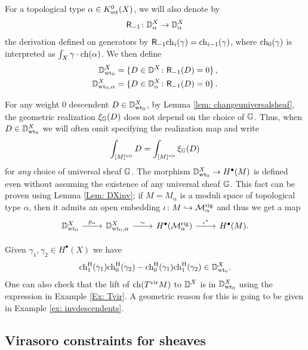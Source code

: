 \documentclass[a4paper, 12pt]{amsart}
\begin{document}
\begin{definition}\label{def: invariantdescendents}
For a topological type $\alpha\in K_{\text{sst}}^0(X)$, we will also denote by 
\[\mathsf{R}_{-1}\colon {\mathbb{D}}^X_{ \alpha}\to {\mathbb{D}}^X_{ \alpha}\] the derivation defined on generators by
$\mathsf{R}_{-1}\mathrm{ch}_i(\gamma)=\mathrm{ch}_{i-1}(\gamma)$,
where $\mathrm{ch}_0(\gamma)$ is interpreted as $\int_X \gamma\cdot \mathrm{ch}(\alpha)$.
We then define
\begin{align*}{\mathbb{D}}^X_{{\mathrm{wt}_0}}&=\{D\in {\mathbb{D}}^X\colon \mathsf{R}_{-1}(D)=0\}\,,\\
{\mathbb{D}}^X_{{\mathrm{wt}_0}, \alpha}&=\{D\in {\mathbb{D}}^X_{\alpha}\colon \mathsf{R}_{-1}(D)=0\}\,.
\end{align*} 
\end{definition}

For any weight 0 descendent $D\in {\mathbb{D}}^X_{{\mathrm{wt}_0}}$, by Lemma \ref{lem: changeuniversalsheaf}, the geometric realization $\xi_{{\mathbb{G}}}(D)$ does not depend on the choice of ${\mathbb{G}}$. Thus, when $D\in {\mathbb{D}}^X_{{\mathrm{wt}_0}}$ we will often omit specifying the realization map and write
\[\int_{[M]^{\mathrm{vir}}} D=\int_{[M]^{\mathrm{vir}}}\xi_{{\mathbb{G}}}(D)\]
for \emph{any} choice of universal sheaf ${\mathbb{G}}$. 
The morphism ${\mathbb{D}}^X_{{\mathrm{wt}_0}}\to H^\bullet(M)$ is defined even without assuming the existence of any universal sheaf ${\mathbb{G}}$. This fact can be proven using Lemma \ref{Lem: DXinv}; if $M=M_\alpha$ is a moduli space of topological type $\alpha$, then it admits an open embedding $\iota\colon M\hookrightarrow {\mathcal M}_\alpha^{\mathrm{rig}}$ and thus we get a map
\[\begin{tikzcd}
\BD^X_{\inv}\arrow[r, "p_\alpha"]&
\BD^X_{\inv, \alpha}\arrow[r, "\sim"]&
H^\bullet(\CM_\alpha^\rig)\arrow[r, "\iota^\ast"]&
H^\bullet(M).
\end{tikzcd}\]

\begin{example}\label{Ex: DXinvdescendents}
Given $\gamma_1,\gamma_2\in H^\bullet(X)$ we have
\[\mathrm{ch}^{\mathrm{H}}_1(\gamma_1)\mathrm{ch}^{\mathrm{H}}_0(\gamma_2)-\mathrm{ch}^{\mathrm{H}}_0(\gamma_1)\mathrm{ch}^{\mathrm{H}}_1(\gamma_2)\in {\mathbb{D}}^X_{{\mathrm{wt}_0}}.\]
One can also check that the lift of $\mathrm{ch}(T^{\mathrm{vir}} M)$ to ${\mathbb{D}}^X$ is in ${\mathbb{D}}^X_{{\mathrm{wt}_0}}$ using the expression in Example \ref{Ex: Tvir}. A geometric reason for this is going to be given in Example \ref{ex: invdescendents}.
\end{example}



\subsection{Virasoro constraints for sheaves}
\label{sec: virasorosheaves}
\end{document}
